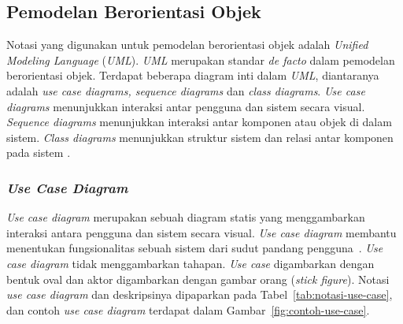 \subsection{Pemodelan Berorientasi Objek}

Notasi yang digunakan untuk pemodelan berorientasi objek adalah
\emph{Unified Modeling Language} (\emph{UML}). \emph{UML} merupakan
standar \emph{de facto} dalam pemodelan berorientasi objek. Terdapat
beberapa diagram inti dalam \emph{UML}, diantaranya adalah \emph{use
  case diagrams, sequence diagrams} dan \emph{class
  diagrams}. \emph{Use case diagrams} menunjukkan interaksi antar
pengguna dan sistem secara visual. \emph{Sequence diagrams}
menunjukkan interaksi antar komponen atau objek di dalam
sistem. \emph{Class diagrams} menunjukkan struktur sistem dan relasi antar
komponen pada sistem  \parencite{sommerville2016software}.

\subsubsection{\emph{Use Case Diagram}}

\emph{Use case diagram} merupakan sebuah diagram statis yang
menggambarkan interaksi antara pengguna dan sistem secara visual. \emph{Use case
  diagram} membantu menentukan fungsionalitas sebuah sistem dari
sudut pandang pengguna~\parencite{pressman2010software}. \emph{Use
  case diagram} tidak menggambarkan tahapan. \emph{Use case}
digambarkan dengan bentuk oval dan aktor digambarkan dengan gambar
orang (\emph{stick figure}). Notasi \emph{use case diagram}
dan deskripsinya dipaparkan pada Tabel~\ref{tab:notasi-use-case},
dan contoh \emph{use case diagram} terdapat dalam
Gambar~\ref{fig:contoh-use-case}.

